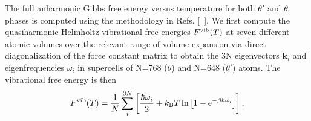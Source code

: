 \documentclass{article}
\begin{document}

The full anharmonic Gibbs free energy versus temperature for both $\theta'$ and $\theta$ phases is computed using the methodology in Refs. [~\cite{Grabowski2009,Glensk2015,Glensk2015b}]. We first compute the quasiharmonic Helmholtz vibrational free energies $F^{\rm vib}(T)$ at seven different atomic volumes over the relevant range of volume expansion via direct diagonalization of the force constant matrix to obtain the 3N eigenvectors $\mathbf{k}_i$ and eigenfrequencies $\omega_{i}$ in supercells of N=768 ($\theta$) and N=648 ($\theta'$) atoms.  The vibrational free energy is then
\begin{equation}
    F^{\rm vib}(T) = \frac{1}{N} \sum_{i}^{3N} \left[\frac{\hbar\omega_{i}}{2} + k_{\rm B} T \ln\left[1-\mathrm{e}^{- \beta \hbar\omega_{i}}\right]\right],
    \label{Fqh3}
\end{equation}
\end{document}
